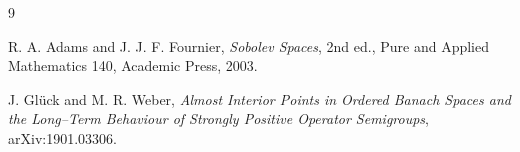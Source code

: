 \documentclass[11pt]{article}
\begin{document}
\begin{thebibliography}{9}

R. A. Adams and J. J. F. Fournier,
\emph{Sobolev Spaces}, 2nd ed.,
Pure and Applied Mathematics 140, Academic Press, 2003.

J. Gl\"uck and M. R. Weber,
\emph{Almost Interior Points in Ordered Banach Spaces and the Long--Term Behaviour of Strongly Positive Operator Semigroups},
arXiv:1901.03306.

\end{thebibliography}
\end{document}
